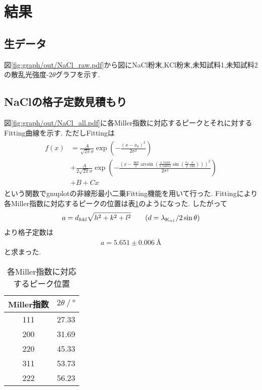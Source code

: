 \section{結果}
\subsection{生データ}
図\ref{fig:graph/out/NaCl_raw.pdf}から図にNaCl粉末,KCl粉末,未知試料1,未知試料2の散乱光強度-$2\theta$グラフを示す.
\subsection{NaClの格子定数見積もり}
図\ref{fig:graph/out/NaCl_all.pdf}に各Miller指数に対応するピークとそれに対するFitting曲線を示す.
ただしFittingは
\begin{align}
  \begin{split}
    f(x)&=\frac{A}{\sqrt{2\pi}\sigma}\exp\left(-\frac{(x-x_0)^2}{2\sigma^2}\right)\\
    &+\frac{A}{2\sqrt{2\pi}\sigma}\exp\left(-\frac{\left(x-\frac{360}{\pi}\arcsin\left(\frac{1.5433}{1.54051}\sin\left(\frac{x_0}{2}\frac{\pi}{180}\right)\right)\right)^2}{2\sigma^2}\right)\\
    &+B+Cx
  \end{split}
\end{align}
という関数でgnuplotの非線形最小二乗Fitting機能を用いて行った.
Fittingにより各Miller指数に対応するピークの位置は表\ref{tab:miller_2theta}のようになった.
したがって
\begin{align}
  a=d_{hkl}\sqrt{h^2+k^2+l^2}\qquad(d=\lambda_{{\rm K}_{\alpha 1}}/2\sin\theta)
\end{align}
より格子定数は
\begin{align}
  a=5.651\pm 0.006\ \si{\angstrom}
\end{align}
と求まった.
\begin{table}[h]
  \caption{各Miller指数に対応するピーク位置}
  \label{tab:miller_2theta}
  \centering
  \begin{tabular}{cc}
  \hline
  Miller指数&$2\theta\ /\ \si{\degree}$\\
  \hline \hline
  111&27.33\\
  200&31.69\\
  220&45.33\\
  311&53.73\\
  222&56.23\\
  \hline
  \end{tabular}
\end{table}
